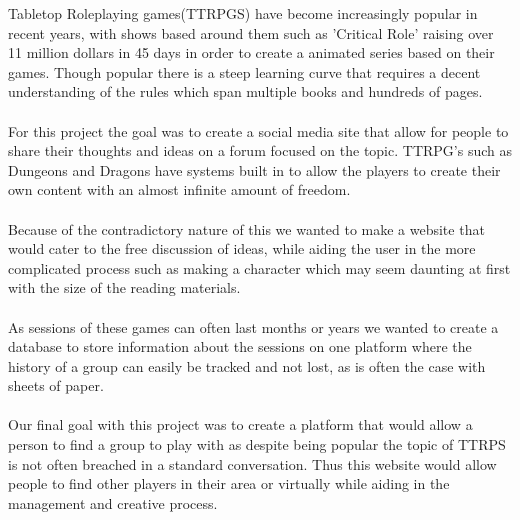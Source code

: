 
Tabletop Roleplaying games(TTRPGS) have become increasingly popular in recent years, with shows based around them such as 'Critical Role' raising over 11 million dollars in 45 days in order to create a animated series based on their games. Though popular there is a steep learning curve that requires a decent understanding of the rules which span multiple books and hundreds of pages. \\\\
For this project the goal was to create a social media site that allow for people to share their thoughts and ideas on a forum focused on the topic. TTRPG's such as Dungeons and Dragons have systems built in to allow the players to create their own content with an almost infinite amount of freedom. \\\\
Because of the contradictory nature of this we wanted to make a website that would cater to the free discussion of ideas, while aiding the user in the more complicated process such as making a character which may seem daunting at first with the size of the reading materials.  \\\\
As sessions of these games can often last months or years we wanted to create a database to store information about the sessions on one platform where the history of a group can easily be tracked and not lost, as is often the case with sheets of paper.  \\\\
Our final goal with this project was to create a platform that would allow a person to find a group to play with as despite being popular the topic of TTRPS is not often breached in a standard conversation. Thus this website would allow people to find other players in their area or virtually while aiding in the management and creative process.
